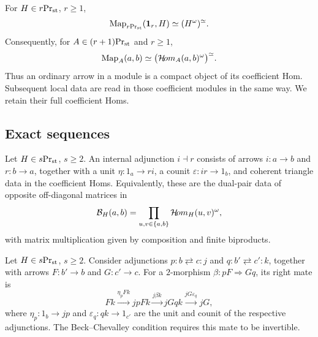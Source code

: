 For $H\in{r}\mathrm{Pr}_{\mathrm{st}}$, $r\geq1$,
\[
 \operatorname{Map}_{{r}\mathrm{Pr}_{\mathrm{st}}}(\mathbf 1_r,H)\simeq(H^\omega)^\simeq.
\]
Consequently, for $A\in{(r+1)}\mathrm{Pr}_{\mathrm{st}}$ and $r\geq1$,
\[
 \operatorname{Map}_A(a,b)\simeq\bigl(\mathcal{H}\!om_A(a,b)^\omega\bigr)^\simeq.
\]
Thus an ordinary arrow in a module is a compact object of its
coefficient Hom. Subsequent local data are read in those coefficient
modules in the same way. We retain their full coefficient Homs.

\subsection{Exact sequences}

\begin{definition}\label{def:adjunction}
Let $H\in{s}\mathrm{Pr}_{\mathrm{st}}$, $s\geq2$.
An internal adjunction $i\dashv r$ consists of
arrows $i:a\to b$ and $r:b\to a$, together
with a unit $\eta:1_a\to ri$, a counit
$\varepsilon:ir\to1_b$, and coherent triangle
data in the coefficient Homs.
Equivalently, these are the dual-pair data
of opposite off-diagonal matrices in
\[
 \mathcal B_H(a,b)=
 \prod_{u,v\in\{a,b\}}
 \mathcal{H}\!om_H(u,v)^\omega,
\]
with matrix multiplication given by composition
and finite biproducts.
\end{definition}


Let $H\in{s}\mathrm{Pr}_{\mathrm{st}}$, $s\geq2$. Consider adjunctions
$p:b\rightleftarrows c:j$ and $q:b'\rightleftarrows c':k$,
together with arrows $F:b'\to b$ and $G:c'\to c$.
For a $2$-morphism $\beta:pF\Rightarrow Gq$, its right mate is
\[
 Fk\xrightarrow{\eta_p Fk}jpFk
   \xrightarrow{j\beta k}jGqk
   \xrightarrow{jG\varepsilon_q}jG,
\]
where $\eta_p:1_b\to jp$ and $\varepsilon_q:qk\to1_{c'}$
are the unit and counit of the respective adjunctions.
The Beck--Chevalley condition requires this mate to be invertible.



